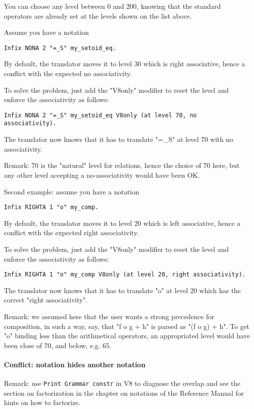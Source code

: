 \documentclass[11pt,a4paper]{article}
\begin{document}
  You can choose any level between 0 and 200, knowing that the
standard operators are already set at the levels shown on the list
above.

Assume you have a notation
\begin{verbatim}
Infix NONA 2 "=_S" my_setoid_eq.
\end{verbatim}
By default, the translator moves it to level 30 which is right
associative, hence a conflict with the expected no associativity.

To solve the problem, just add the "V8only" modifier to reset the
level and enforce the associativity as follows:
\begin{verbatim}
Infix NONA 2 "=_S" my_setoid_eq V8only (at level 70, no associativity).
\end{verbatim}
The translator now knows that it has to translate "=_S" at level 70
with no associativity.

Remark: 70 is the "natural" level for relations, hence the choice of 70
here, but any other level accepting a no-associativity would have been
OK.

Second example: assume you have a notation
\begin{verbatim}
Infix RIGHTA 1 "o" my_comp.
\end{verbatim}
By default, the translator moves it to level 20 which is left
associative, hence a conflict with the expected right associativity.

To solve the problem, just add the "V8only" modifier to reset the
level and enforce the associativity as follows:
\begin{verbatim}
Infix RIGHTA 1 "o" my_comp V8only (at level 20, right associativity).
\end{verbatim}
The translator now knows that it has to translate "o" at level 20
which has the correct "right associativity".

Remark: we assumed here that the user wants a strong precedence for
composition, in such a way, say, that "f o g + h" is parsed as
"(f o g) + h". To get "o" binding less than the arithmetical operators,
an appropriated level would have been close of 70, and below, e.g. 65.


\paragraph{Conflict: notation hides another notation}

Remark: use {\tt Print Grammar constr} in V8 to diagnose the overlap
and see the section on factorization in the chapter on notations of
the Reference Manual for hints on how to factorize.
\end{document}
